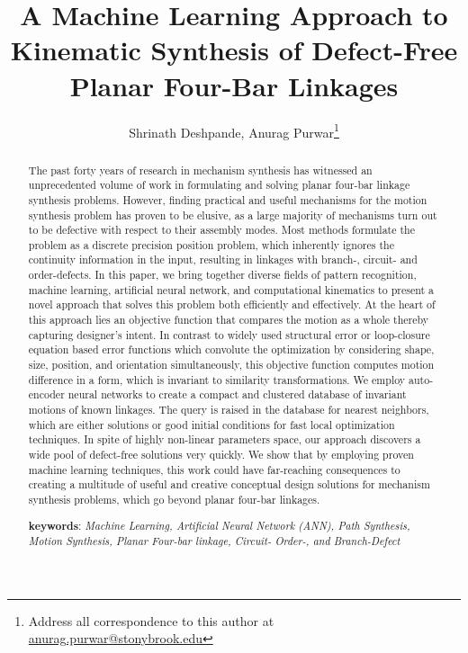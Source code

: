 \documentclass[twocolumn,10pt]{asme2e}
\title{A Machine Learning Approach to Kinematic Synthesis of Defect-Free Planar Four-Bar Linkages}
\author{Shrinath Deshpande,
	{\tensfb Anurag Purwar\thanks{Address all correspondence to this author at \href{anurag.purwar@stonybrook.edu}{anurag.purwar@stonybrook.edu}}}
    \affiliation{
	Computer-Aided Design and Innovation Lab\\
	Department of Mechanical Engineering\\
	Stony Brook University\\
	Stony Brook, New York, 11794-2300
    }
}
\begin{document}
\maketitle

\begin{abstract}
The past forty years of research in mechanism synthesis has witnessed an unprecedented volume of work in formulating and solving planar four-bar linkage synthesis problems.
However, finding practical and useful mechanisms for the motion synthesis problem has proven to be elusive, as a large majority of mechanisms turn out to be defective with respect to their assembly modes.
Most methods formulate the problem as a discrete precision position problem, which inherently ignores the continuity information in the input, resulting in linkages with branch-, circuit- and order-defects.
In this paper, we bring together diverse fields of pattern recognition, machine learning, artificial neural network, and computational kinematics to present a novel approach that solves this problem both efficiently and effectively.
At the heart of this approach lies an objective function that compares the motion as a whole thereby capturing designer's intent.
In contrast to widely used structural error or loop-closure equation based error functions which convolute the optimization by considering shape, size, position, and orientation simultaneously, this objective function computes motion difference in a form, which is invariant to similarity transformations.
We employ auto-encoder neural networks to create a compact and clustered database of invariant motions of known linkages.
The query is raised in the database for nearest neighbors, which are either solutions or good initial conditions for fast local optimization techniques.
In spite of highly non-linear parameters space, our approach discovers a wide pool of defect-free solutions very quickly.
We show that by employing proven machine learning techniques, this work could have far-reaching consequences to creating a multitude of useful and creative conceptual design solutions for mechanism synthesis problems, which go beyond planar four-bar linkages.

\textbf{keywords}: \emph{Machine Learning, Artificial Neural Network (ANN), Path Synthesis, Motion Synthesis, Planar Four-bar linkage, Circuit- Order-, and Branch-Defect}

\end{abstract}
\end{document}
